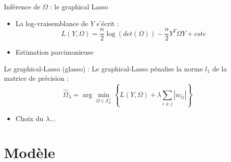 \documentclass[11pt]{bredelebeamer}
\begin{document}
\begin{frame}{Inférence de $\Omega$ : le graphical Lasso}
\begin{itemize}

 \item La log-vraisemblance de  $Y$ s'écrit :
 \[L(Y,\Omega) = \frac{n}{2}\log(det(\Omega))-\frac{n}{2} Y^T\Omega Y + cste\]

 \item  Estimation parcimonieuse
\end{itemize}
 \begin{exampleblock}{ Le graphical-Lasso (glasso) :}
  Le graphical-Lasso pénalise la norme $l_1$ de la matrice de précision :
  \[\widehat{\Omega}_\lambda = \arg\min_{\Omega \in \mathcal{S}_d^+}\left\{ L(Y,\Omega)+\lambda \sum_{i\neq j} |w_{ij}| \right\}\]
 \end{exampleblock}
 \begin{itemize}
  \item Choix du $\lambda$...
 \end{itemize}

\end{frame}
\section{Modèle}
\end{document}
